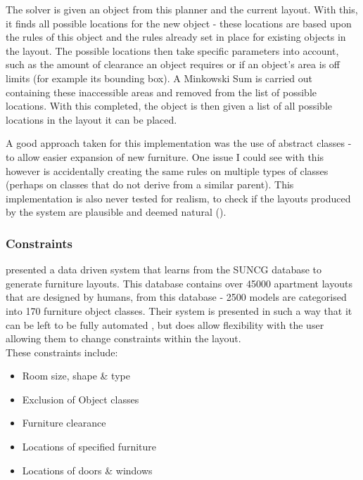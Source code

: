 The solver is given an object from this planner and the current layout. With this, it finds all possible locations for the new object - these locations are based upon the rules of this object and the rules already set in place for existing objects in the layout. The possible locations then take specific parameters into account, such as the amount of clearance an object requires or if an object's area is off limits (for example its bounding box)\cite{rule-based-layout}. A Minkowski Sum \cite{minkowski} is carried out containing these inaccessible areas and removed from the list of possible locations.
With this completed, the object is then given a list of all possible locations in the layout it can be placed.

A good approach taken for this implementation was the use of abstract classes - to allow easier expansion of new furniture. One issue I could see with this however is accidentally creating the same rules on multiple types of classes (perhaps on classes that do not derive from a similar parent). This implementation is also never tested for realism, to check if the layouts produced by the system are plausible and deemed natural ().

\bigskip
\subsubsection{Constraints}
 \cite{constrained-layouts} presented a data driven system that learns from the SUNCG \cite{suncg} database to generate furniture layouts. This database contains over 45000 apartment layouts that are designed by humans, from this database - 2500 models are categorised into 170 furniture object classes.
Their system is presented in such a way that it can be left to be fully automated \cite{constrained-layouts}, but does allow flexibility with the user allowing them to change constraints within the layout.\\
These constraints include:
\begin{itemize}
    \item Room size, shape \& type 
    \item Exclusion of Object classes
    \item Furniture clearance 
    \item Locations of specified furniture
    \item Locations of doors \& windows
\end{itemize}

